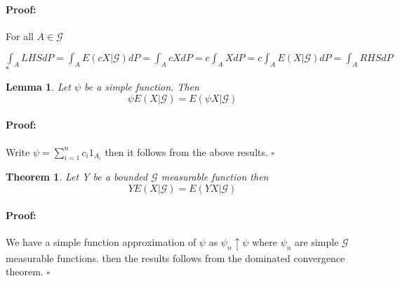 \documentclass{article}
\newenvironment{proof}{\paragraph{Proof:}}{\hfill$\square$}
\newtheorem{theorem}{Theorem}[section]
\newtheorem{lemma}{Lemma}[section]
\begin{document}
\begin{proof}
    For all $A \in \mathcal{G} $
    
    $\int_A LHS dP= \int_A E(cX|\mathcal{G} ) dP = \int_A cX dP = c\int_A X dP = c\int_A E(X|\mathcal{G} ) dP = \int_A RHS dP$
\end{proof}
\begin{lemma}
    Let $\psi $ be a simple function. Then \[ \psi E(X|\mathcal{G} ) = E(\psi X|\mathcal{G} ) \]
\end{lemma}
\begin{proof}
    Write $\psi = \sum_{i = 1}^{n} c_i1_{A_i}   $  then it follows from the above results.
\end{proof}
\begin{theorem}
    Let Y be a bounded $\mathcal{G} $ measurable function then \[YE(X|\mathcal{G} ) = E(YX|\mathcal{G} )\]
\end{theorem}
\begin{proof}
    We have a simple function approximation of $\psi $ as $\psi_n \uparrow \psi $ where $\psi_n$ are simple $\mathcal{G} $ measurable functions. then the results follows from the dominated convergence theorem.  
\end{proof}
\end{document}

